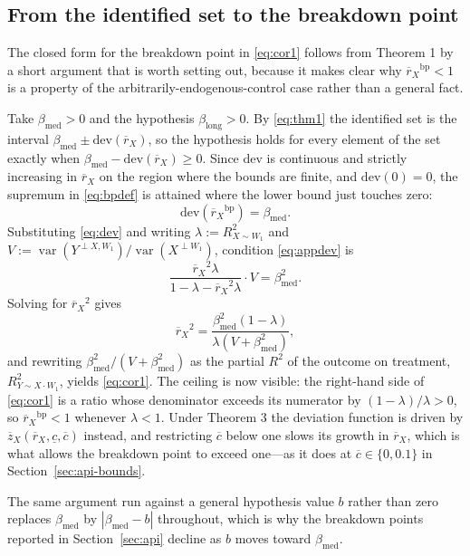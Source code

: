 \documentclass[article]{jss}\usepackage[]{graphicx}\usepackage[]{xcolor}
\newcommand{\blong}{\beta_{\mathrm{long}}}
\newcommand{\bmed}{\beta_{\mathrm{med}}}
\newcommand{\rxbar}{\ensuremath{\overline{r}_X}}
\newcommand{\cbar}{\ensuremath{\overline{c}}}
\newcommand{\clow}{\ensuremath{\underline{c}}}
\newcommand{\Rsq}[1]{\ensuremath{R^2_{#1}}}
\newcommand{\Var}{\operatorname{var}}
\begin{document}
\newpage
\begin{appendix}

\section{From the identified set to the breakdown point}\label{app:deriv}

The closed form for the breakdown point in \eqref{eq:cor1} follows from
Theorem 1 by a short argument that is worth setting out, because it makes
clear why $\rxbar^{\mathrm{bp}} < 1$ is a property of the
arbitrarily-endogenous-control case rather than a general fact.

Take $\bmed > 0$ and the hypothesis $\blong > 0$. By \eqref{eq:thm1} the
identified set is the interval $\bmed \pm \mathrm{dev}(\rxbar)$, so the
hypothesis holds for every element of the set exactly when
$\bmed - \mathrm{dev}(\rxbar) \ge 0$. Since $\mathrm{dev}$ is continuous
and strictly increasing in $\rxbar$ on the region where the bounds are
finite, and $\mathrm{dev}(0) = 0$, the supremum in \eqref{eq:bpdef} is
attained where the lower bound just touches zero:
\begin{equation}
\mathrm{dev}(\rxbar^{\mathrm{bp}}) = \bmed .
\label{eq:appdev}
\end{equation}
Substituting \eqref{eq:dev} and writing $\lambda := \Rsq{X \sim W_1}$ and
$V := \Var(Y^{\perp X, W_1}) / \Var(X^{\perp W_1})$, condition
\eqref{eq:appdev} is
\[
\frac{\rxbar^2 \lambda}{1 - \lambda - \rxbar^2 \lambda} \cdot V
= \bmed^2 .
\]
Solving for $\rxbar^2$ gives
\[
\rxbar^2 = \frac{\bmed^2 (1 - \lambda)}
                {\lambda \left(V + \bmed^2\right)},
\]
and rewriting $\bmed^2 / (V + \bmed^2)$ as the partial $R^2$ of the
outcome on treatment, $\Rsq{Y \sim X \cdot W_1}$, yields
\eqref{eq:cor1}. The ceiling is now visible: the right-hand side of
\eqref{eq:cor1} is a ratio whose denominator exceeds its numerator by
$(1 - \lambda)/\lambda > 0$, so $\rxbar^{\mathrm{bp}} < 1$ whenever
$\lambda < 1$. Under Theorem 3 the deviation function is driven by
$\overline{z}_X(\rxbar, \clow, \cbar)$ instead, and restricting $\cbar$
below one slows its growth in $\rxbar$, which is what allows the
breakdown point to exceed one---as it does at
$\cbar \in \{0, 0.1\}$ in Section~\ref{sec:api-bounds}.

The same argument run against a general hypothesis value $b$ rather than
zero replaces $\bmed$ by $|\bmed - b|$ throughout, which is why the
breakdown points reported in Section~\ref{sec:api} decline as $b$ moves
toward $\bmed$.


\end{appendix}
\end{document}
